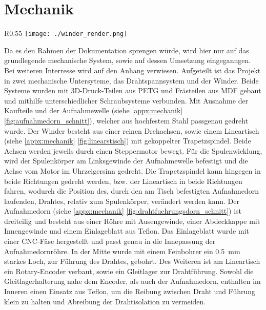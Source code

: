 \section{Mechanik}
\label{sec:Mechanik}




\begin{wrapfigure}{R}{0.55\textwidth}
    \centering
    \texttt{[image: ./winder\_render.png]}
\end{wrapfigure}
Da es den Rahmen der Dokumentation sprengen würde, wird hier nur auf das grundlegende mechanische System, sowie auf dessen Umsetzung eingeganngen. Bei weiteren Interresse wird auf den Anhang verwiesen. Aufgeteilt ist das Projekt in zwei mechanische Untersyteme, das Drahtspannsystem und der Winder.\newline
Beide Systeme wurden mit 3D-Druck-Teilen aus PETG und Frästeilen aus MDF gebaut und mithilfe unterschiedlicher Schraubsysteme verbunden. Mit Ausnahme der Kaufteile und der Aufnahmewelle (siehe \autoref{appx:mechanik} \autoref{fig:aufnahmedorn_schnitt}), welcher aus hochfestem Stahl passgenau gedreht wurde.
\newline
Der Winder besteht aus einer reinen Drehachsen, sowie einem Lineartisch (siehe \autoref{appx:mechanik} \autoref{fig:linearstisch}) mit gekoppelter Trapetzspindel. Beide Achsen werden jeweils durch einen Steppermotor bewegt. Für die Spulenwicklung, wird der Spulenkörper am Linksgewinde der Aufnahmewelle befestigt und die Achse vom Motor im Uhrzeigersinn gedreht. Die Trapetzspindel kann hingegen in beide Richtungen gedreht werden, bzw. der Lineartisch in beide Richtungen fahren, wodurch die Position des, durch den am Tisch befestigten Aufnahmedorn laufenden, Drahtes, relativ zum Spulenkörper, verändert werden kann. Der Aufnahmedorn (siehe \autoref{appx:mechanik} \autoref{fig:drahtfuehrungsdorn_schnitt}) ist dreiteilig und besteht aus einer Röhre mit Ausengewinde, einer Abdeckkappe mit Innengewinde und einem Einlageblatt aus Teflon. Das Einlageblatt wurde mit einer CNC-Fäse hergestellt und passt genau in die Innepassung der Aufnahmedornröhre. In der Mitte wurde mit einem Feinbohrer ein 0.5~\si{\milli\metre} starkes Loch, zur Führung des Drahtes, gebohrt.
Des Weiteren ist am Lineartisch ein Rotary-Encoder verbaut, sowie ein Gleitlager zur Drahtführung. Sowohl die Gleitlagerhalterung nahe dem Encoder, als auch der Aufnahmedorn, enthalten im Inneren einen Einsatz aus Teflon, um die Reibung zwischen Draht und Führung klein zu halten und Abreibung der Drahtisolation zu vermeiden.\newline
